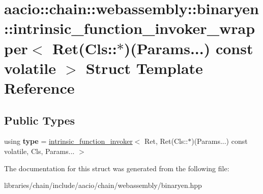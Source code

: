 \hypertarget{structaacio_1_1chain_1_1webassembly_1_1binaryen_1_1intrinsic__function__invoker__wrapper_3_01_re34dc145d5e68f10e2c9be421b7658f88}{}\section{aacio\+:\+:chain\+:\+:webassembly\+:\+:binaryen\+:\+:intrinsic\+\_\+function\+\_\+invoker\+\_\+wrapper$<$ Ret(Cls\+:\+:$\ast$)(Params...) const volatile $>$ Struct Template Reference}
\label{structaacio_1_1chain_1_1webassembly_1_1binaryen_1_1intrinsic__function__invoker__wrapper_3_01_re34dc145d5e68f10e2c9be421b7658f88}
\subsection*{Public Types}
\begin{DoxyCompactItemize}
\item 
\mbox{\label{structaacio_1_1chain_1_1webassembly_1_1binaryen_1_1intrinsic__function__invoker__wrapper_3_01_re34dc145d5e68f10e2c9be421b7658f88_a4225c21e84174e492749f23711552b04}} 
using {\bfseries type} = \mbox{\hyperlink{structaacio_1_1chain_1_1webassembly_1_1binaryen_1_1intrinsic__function__invoker}{intrinsic\+\_\+function\+\_\+invoker}}$<$ Ret, Ret(Cls\+::$\ast$)(Params...) const volatile, Cls, Params... $>$
\end{DoxyCompactItemize}


The documentation for this struct was generated from the following file\+:\begin{DoxyCompactItemize}
\item 
libraries/chain/include/aacio/chain/webassembly/binaryen.\+hpp\end{DoxyCompactItemize}

